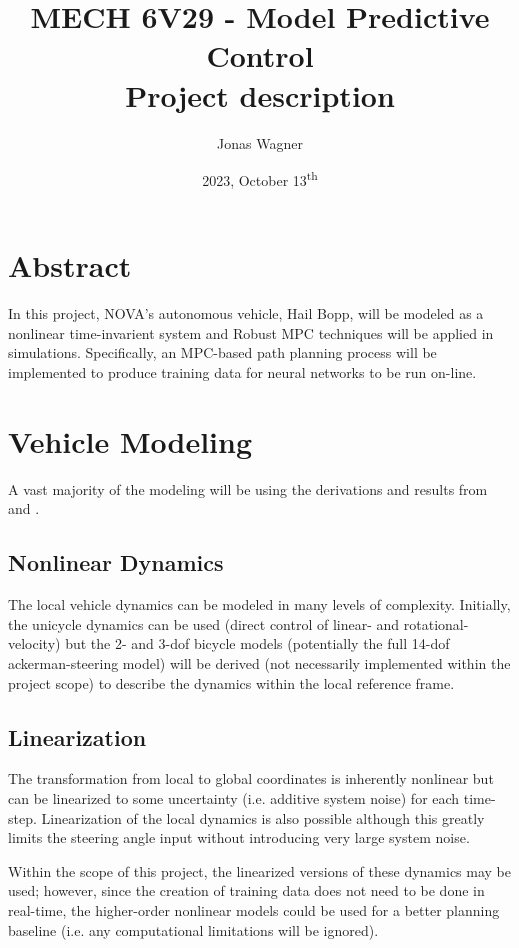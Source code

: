 \documentclass[9pt, onecolumn]{report}
\title{
    MECH 6V29 - Model Predictive Control \\ 
    Project description
}
\author{Jonas Wagner}
\date{2023, October 13\textsuperscript{th}}
\begin{document}
\maketitle

\section*{Abstract}
In this project, NOVA's autonomous vehicle, Hail Bopp, will be modeled as a nonlinear time-invarient system and Robust MPC techniques will be applied in simulations.
Specifically, an MPC-based path planning process will be implemented to produce training data for neural networks to be run on-line.

\section*{Vehicle Modeling}
A vast majority of the modeling will be using the derivations and results from \cite{vehcileDynamics_chapter2a} and \cite{casanova_thesis}.

\subsection*{Nonlinear Dynamics}
The local vehicle dynamics can be modeled in many levels of complexity.
Initially, the unicycle dynamics can be used (direct control of linear- and rotational-velocity) but the 2- and 3-dof bicycle models (potentially the full 14-dof ackerman-steering model) will be derived (not necessarily implemented within the project scope) to describe the dynamics within the local reference frame.

\subsection*{Linearization}
The transformation from local to global coordinates is inherently nonlinear but can be linearized to some uncertainty (i.e. additive system noise) for each time-step.
Linearization of the local dynamics is also possible although this greatly limits the steering angle input without introducing very large system noise.

Within the scope of this project, the linearized versions of these dynamics may be used; however, since the creation of training data does not need to be done in real-time, the higher-order nonlinear models could be used for a better planning baseline (i.e. any computational limitations will be ignored).
\end{document}

